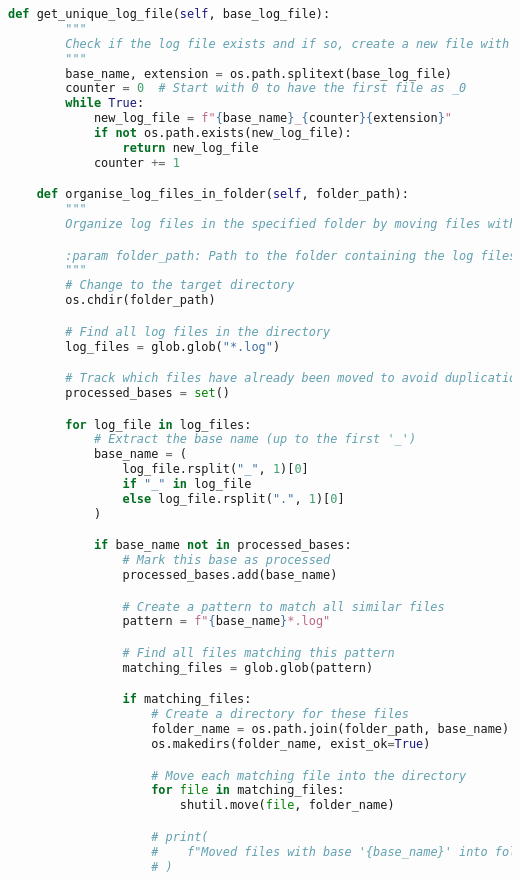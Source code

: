 \begin{lstlisting}[language = Python]
    def get_unique_log_file(self, base_log_file):
        """
        Check if the log file exists and if so, create a new file with a unique suffix.
        """
        base_name, extension = os.path.splitext(base_log_file)
        counter = 0  # Start with 0 to have the first file as _0
        while True:
            new_log_file = f"{base_name}_{counter}{extension}"
            if not os.path.exists(new_log_file):
                return new_log_file
            counter += 1

    def organise_log_files_in_folder(self, folder_path):
        """
        Organize log files in the specified folder by moving files with the same base name into a dedicated directory.

        :param folder_path: Path to the folder containing the log files.
        """
        # Change to the target directory
        os.chdir(folder_path)

        # Find all log files in the directory
        log_files = glob.glob("*.log")

        # Track which files have already been moved to avoid duplication
        processed_bases = set()

        for log_file in log_files:
            # Extract the base name (up to the first '_')
            base_name = (
                log_file.rsplit("_", 1)[0]
                if "_" in log_file
                else log_file.rsplit(".", 1)[0]
            )

            if base_name not in processed_bases:
                # Mark this base as processed
                processed_bases.add(base_name)

                # Create a pattern to match all similar files
                pattern = f"{base_name}*.log"

                # Find all files matching this pattern
                matching_files = glob.glob(pattern)

                if matching_files:
                    # Create a directory for these files
                    folder_name = os.path.join(folder_path, base_name)
                    os.makedirs(folder_name, exist_ok=True)

                    # Move each matching file into the directory
                    for file in matching_files:
                        shutil.move(file, folder_name)

                    # print(
                    #    f"Moved files with base '{base_name}' into folder: {folder_name}"
                    # )


\end{lstlisting}
